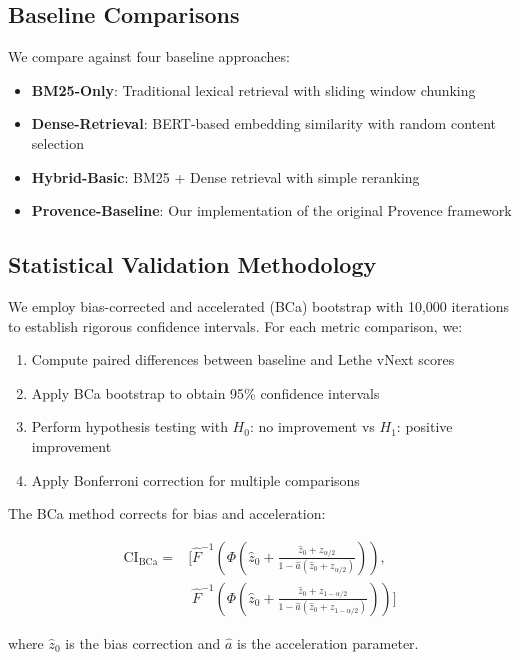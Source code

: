 \documentclass[conference]{IEEEtran}
\begin{document}
\subsection{Baseline Comparisons}

We compare against four baseline approaches:
\begin{itemize}
\item \textbf{BM25-Only}: Traditional lexical retrieval with sliding window chunking
\item \textbf{Dense-Retrieval}: BERT-based embedding similarity with random content selection
\item \textbf{Hybrid-Basic}: BM25 + Dense retrieval with simple reranking
\item \textbf{Provence-Baseline}: Our implementation of the original Provence framework
\end{itemize}

\subsection{Statistical Validation Methodology}

We employ bias-corrected and accelerated (BCa) bootstrap \cite{efron1993introduction} with 10,000 iterations to establish rigorous confidence intervals. For each metric comparison, we:

\begin{enumerate}
\item Compute paired differences between baseline and Lethe vNext scores
\item Apply BCa bootstrap to obtain 95\% confidence intervals
\item Perform hypothesis testing with $H_0$: no improvement vs $H_1$: positive improvement
\item Apply Bonferroni correction for multiple comparisons
\end{enumerate}

The BCa method corrects for bias and acceleration:

\begin{align}
\text{CI}_{\text{BCa}} = &[\hat{F}^{-1}(\Phi(\hat{z}_0 + \frac{\hat{z}_0 + z_{\alpha/2}}{1 - \hat{a}(\hat{z}_0 + z_{\alpha/2})})), \\
&\phantom{[}\hat{F}^{-1}(\Phi(\hat{z}_0 + \frac{\hat{z}_0 + z_{1-\alpha/2}}{1 - \hat{a}(\hat{z}_0 + z_{1-\alpha/2})}))]
\end{align}

where $\hat{z}_0$ is the bias correction and $\hat{a}$ is the acceleration parameter.
\end{document}
